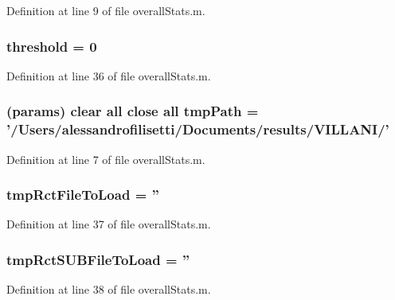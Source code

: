 Definition at line 9 of file overall\+Stats.\+m.

\hypertarget{a00032_a9ec673b91cb4ce5ba9842d584db1eea2}{
\subsubsection[{threshold}]{ threshold = 0}}\label{a00032_a9ec673b91cb4ce5ba9842d584db1eea2}


Definition at line 36 of file overall\+Stats.\+m.

\hypertarget{a00032_a1e5a4863ab2b87f923e1d19e2da1f5ac}{
\subsubsection[{tmp\+Path}]{(params) clear all close all tmp\+Path = '/Users/alessandrofilisetti/Documents/results/V\+I\+L\+L\+A\+N\+I/'}}\label{a00032_a1e5a4863ab2b87f923e1d19e2da1f5ac}


Definition at line 7 of file overall\+Stats.\+m.

\hypertarget{a00032_a729812cd35dceb80bddf2bea4d57c3d5}{
\subsubsection[{tmp\+Rct\+File\+To\+Load}]{ tmp\+Rct\+File\+To\+Load = ''}}\label{a00032_a729812cd35dceb80bddf2bea4d57c3d5}


Definition at line 37 of file overall\+Stats.\+m.

\hypertarget{a00032_aa7c848ee61f4363047d50b027f539e68}{
\subsubsection[{tmp\+Rct\+S\+U\+B\+File\+To\+Load}]{ tmp\+Rct\+S\+U\+B\+File\+To\+Load = ''}}\label{a00032_aa7c848ee61f4363047d50b027f539e68}


Definition at line 38 of file overall\+Stats.\+m.

